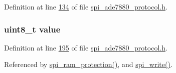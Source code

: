 Definition at line \hyperlink{a00041_source_l00134}{134} of file \hyperlink{a00041_source}{spi\-\_\-ade7880\-\_\-protocol.\-h}.

\hypertarget{a00041_a638e4503e0ae6ce655b7ad2e17e8f0ad}{
\subsubsection[{value}]{\setlength{\rightskip}{0pt plus 5cm}uint8\-\_\-t value}}\label{dd/d32/a00041_a638e4503e0ae6ce655b7ad2e17e8f0ad}


Definition at line \hyperlink{a00041_source_l00195}{195} of file \hyperlink{a00041_source}{spi\-\_\-ade7880\-\_\-protocol.\-h}.



Referenced by \hyperlink{a00040_source_l00343}{spi\-\_\-ram\-\_\-protection()}, and \hyperlink{a00040_source_l00221}{spi\-\_\-write()}.


